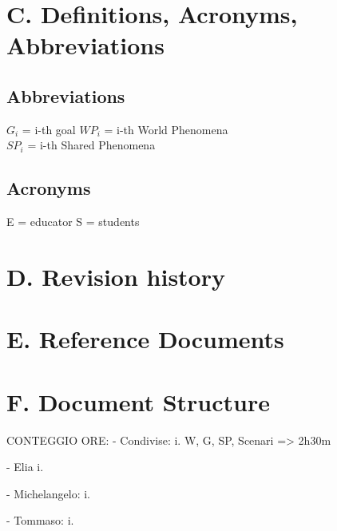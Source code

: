 \section{C. Definitions, Acronyms, Abbreviations}
\subsection{Abbreviations}
\(G_i\) = i-th goal
\(WP_i\) = i-th World Phenomena\\
\(SP_i\) = i-th Shared Phenomena\\

\subsection{Acronyms}
E = educator
S = students
\section{D. Revision history}
\section{E. Reference Documents}
\section{F. Document Structure}

CONTEGGIO ORE:
- Condivise:
i. W, G, SP, Scenari => 2h30m

- Elia
i.

- Michelangelo:
i.

- Tommaso:
i.
